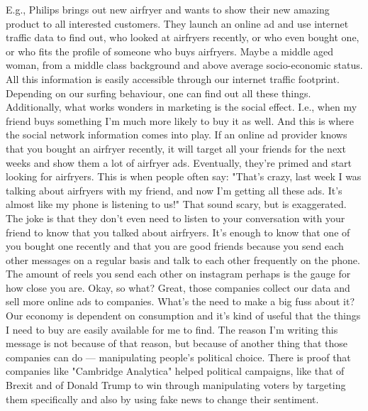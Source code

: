 \documentclass[12pt]{article}
\begin{document}
E.g., Philips brings out new airfryer and wants to show their new amazing product to all interested customers.
They launch an online ad and use internet traffic data to find out, who looked at airfryers recently, or who even bought one, or who fits the profile of someone who buys airfryers.
Maybe a middle aged woman, from a middle class background and above average socio-economic status.
All this information is easily accessible through our internet traffic footprint.
Depending on our surfing behaviour, one can find out all these things.
Additionally, what works wonders in marketing is the social effect.
I.e., when my friend buys something I'm much more likely to buy it as well.
And this is where the social network information comes into play.
If an online ad provider knows that you bought an airfryer recently, it will target all your friends for the next weeks and show them a lot of airfryer ads.
Eventually, they're primed and start looking for airfryers.
This is when people often say: "That's crazy, last week I was talking about airfryers with my friend, and now I'm getting all these ads. It's almost like my phone is listening to us!"
That sound scary, but is exaggerated.
The joke is that they don't even need to listen to your conversation with your friend to know that you talked about airfryers.
It's enough to know that one of you bought one recently and that you are good friends because you send each other messages on a regular basis and talk to each other frequently on the phone.
The amount of reels you send each other on instagram perhaps is the gauge for how close you are.
Okay, so what?
Great, those companies collect our data and sell more online ads to companies.
What's the need to make a big fuss about it?
Our economy is dependent on consumption and it's kind of useful that the things I need to buy are easily available for me to find.
The reason I'm writing this message is not because of that reason, but because of another thing that those companies can do --- manipulating people's political choice.
There is proof that companies like "Cambridge Analytica" helped political campaigns, like that of Brexit and of Donald Trump to win through manipulating voters by targeting them specifically and also by using fake news to change their sentiment.
\end{document}
